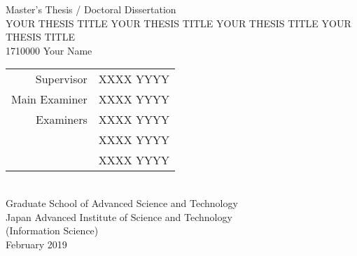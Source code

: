 \pagestyle{empty}
\begin{center}
Master's Thesis / Doctoral Dissertation\\%
\vspace{100pt}
\MakeUppercase{Your Thesis Title Your Thesis Title Your Thesis Title Your Thesis Title}\\
\vspace{100pt}
1710000 %
\quad
Your Name\\
\vspace{100pt}
\begin{tabular}{rl}
Supervisor & XXXX YYYY\\
Main Examiner & XXXX YYYY\\
Examiners & XXXX YYYY\\
& XXXX YYYY\\
& XXXX YYYY
\end{tabular}\\
\vspace{100pt}
Graduate School of Advanced Science and Technology\\ %
Japan Advanced Institute of Science and Technology\\
(Information Science)\\ %
\vfill
February 2019\\ %
\vfill
\end{center}
\cleardoublepage
